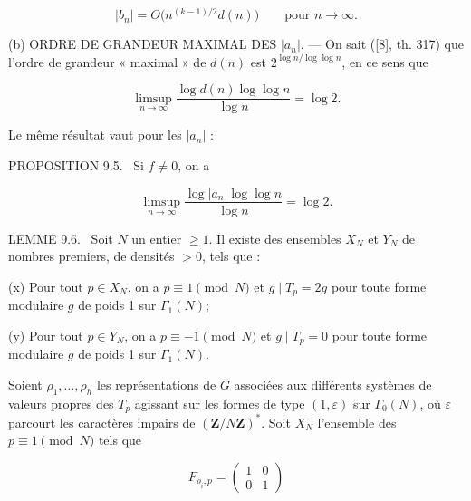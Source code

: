 \documentclass[10pt,oneside]{article}
\begin{document}
\begin{equation*}
|b_n|=O\bigl(n^{(k-1)/2}d(n)\bigr)
\qquad\text{pour }n\longrightarrow\infty.
\end{equation*}

(b) ORDRE DE GRANDEUR MAXIMAL DES \(|a_n|\). — On sait ([8], th. 317) que l'ordre de grandeur « maximal » de \(d(n)\) est \(2^{\log n/\log\log n}\), en ce sens que\par

\begin{equation*}
\limsup_{n\to\infty}\frac{\log d(n)\log\log n}{\log n}=\log2.
\end{equation*}

Le même résultat vaut pour les \(|a_n|\) :\par

\noindent\textsc{PROPOSITION 9.5.} \textemdash\ Si \(f\ne0\), on a\par

\begin{equation*}
\limsup_{n\to\infty}\frac{\log|a_n|\log\log n}{\log n}=\log2.
\end{equation*}

\noindent\textsc{LEMME 9.6.} \textemdash\ Soit \(N\) un entier \(\geq1\). Il existe des ensembles \(X_N\) et \(Y_N\) de nombres premiers, de densités \(>0\), tels que :\par

(x) Pour tout \(p\in X_N\), on a \(p\equiv1\pmod N\) et \(g\mid T_p=2g\) pour toute forme modulaire \(g\) de poids 1 sur \(\Gamma_1(N)\);\par

(y) Pour tout \(p\in Y_N\), on a \(p\equiv-1\pmod N\) et \(g\mid T_p=0\) pour toute forme modulaire \(g\) de poids 1 sur \(\Gamma_1(N)\).\par

Soient \(\rho_1,\ldots,\rho_h\) les représentations de \(G\) associées aux différents systèmes de valeurs propres des \(T_p\) agissant sur les formes de type \((1,\varepsilon)\) sur \(\Gamma_0(N)\), où \(\varepsilon\) parcourt les caractères impairs de \((\mathbf Z/N\mathbf Z)^*\). Soit \(X_N\) l'ensemble des \(p\equiv1\pmod N\) tels que\par

\begin{equation*}
F_{\rho_i,p}=\begin{pmatrix}1&0\\0&1\end{pmatrix}
\end{equation*}
\end{document}
